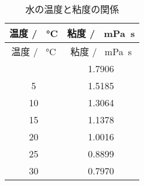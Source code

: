 \begin{longtable}{cc}
    \caption{水の温度と粘度の関係} \label{tab:water-viscosity}               \\
    \hline 温度 / \SI{}{\celsius} & 粘度 / \SI{}{\milli\pascal\second} \\ \hline
    \endfirsthead
    \hline 温度 / \SI{}{\celsius} & 粘度 / \SI{}{\milli\pascal\second} \\ \hline
    \endhead
    \hline
    \endfoot
    0                           & 1.7906                           \\
    5                           & 1.5185                           \\
    10                          & 1.3064                           \\
    15                          & 1.1378                           \\
    20                          & 1.0016                           \\
    25                          & 0.8899                           \\
    30                          & 0.7970                           \\
\end{longtable}
